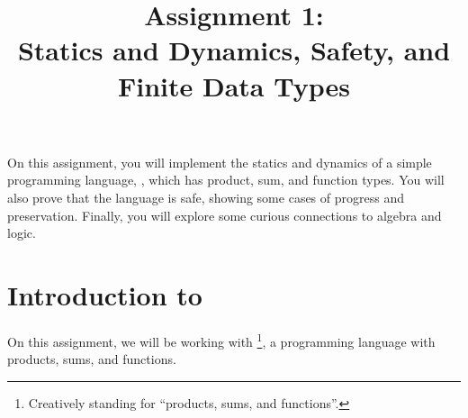 \documentclass[11pt]{article}
\title{Assignment 1: \\
       Statics and Dynamics, Safety, and Finite Data Types}
\begin{document}
\maketitle

On this assignment, you will implement the statics and dynamics of a simple programming language, \LangPSF{}, which has product, sum, and function types.
You will also prove that the language is safe, showing some cases of progress and preservation.
Finally, you will explore some curious connections to algebra and logic.


\section[Introduction to PSF]{Introduction to \LangPSF{}}

On this assignment, we will be working with \LangPSF{}\footnote{Creatively standing for ``products, sums, and functions''.}, a programming language with products, sums, and functions.
\end{document}

